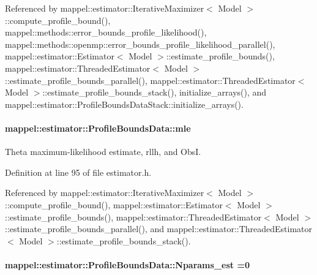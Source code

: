 Referenced by mappel\+::estimator\+::\+Iterative\+Maximizer$<$ Model $>$\+::compute\+\_\+profile\+\_\+bound(), mappel\+::methods\+::error\+\_\+bounds\+\_\+profile\+\_\+likelihood(), mappel\+::methods\+::openmp\+::error\+\_\+bounds\+\_\+profile\+\_\+likelihood\+\_\+parallel(), mappel\+::estimator\+::\+Estimator$<$ Model $>$\+::estimate\+\_\+profile\+\_\+bounds(), mappel\+::estimator\+::\+Threaded\+Estimator$<$ Model $>$\+::estimate\+\_\+profile\+\_\+bounds\+\_\+parallel(), mappel\+::estimator\+::\+Threaded\+Estimator$<$ Model $>$\+::estimate\+\_\+profile\+\_\+bounds\+\_\+stack(), initialize\+\_\+arrays(), and mappel\+::estimator\+::\+Profile\+Bounds\+Data\+Stack\+::initialize\+\_\+arrays().

\paragraph[{\texorpdfstring{mle}{mle}}]{ mappel\+::estimator\+::\+Profile\+Bounds\+Data\+::mle}\hypertarget{structmappel_1_1estimator_1_1ProfileBoundsData_a719ed1845a32b5e7af3f7e2fdd18149d}{}\label{structmappel_1_1estimator_1_1ProfileBoundsData_a719ed1845a32b5e7af3f7e2fdd18149d}


Theta maximum-\/likelihood estimate, rllh, and ObsI. 



Definition at line 95 of file estimator.\+h.



Referenced by mappel\+::estimator\+::\+Iterative\+Maximizer$<$ Model $>$\+::compute\+\_\+profile\+\_\+bound(), mappel\+::estimator\+::\+Estimator$<$ Model $>$\+::estimate\+\_\+profile\+\_\+bounds(), mappel\+::estimator\+::\+Threaded\+Estimator$<$ Model $>$\+::estimate\+\_\+profile\+\_\+bounds\+\_\+parallel(), and mappel\+::estimator\+::\+Threaded\+Estimator$<$ Model $>$\+::estimate\+\_\+profile\+\_\+bounds\+\_\+stack().

\paragraph[{\texorpdfstring{Nparams\+\_\+est}{Nparams_est}}]{ mappel\+::estimator\+::\+Profile\+Bounds\+Data\+::\+Nparams\+\_\+est =0}\hypertarget{structmappel_1_1estimator_1_1ProfileBoundsData_a5dd4b18893235445bca9608d5746c6c2}{}\label{structmappel_1_1estimator_1_1ProfileBoundsData_a5dd4b18893235445bca9608d5746c6c2}


